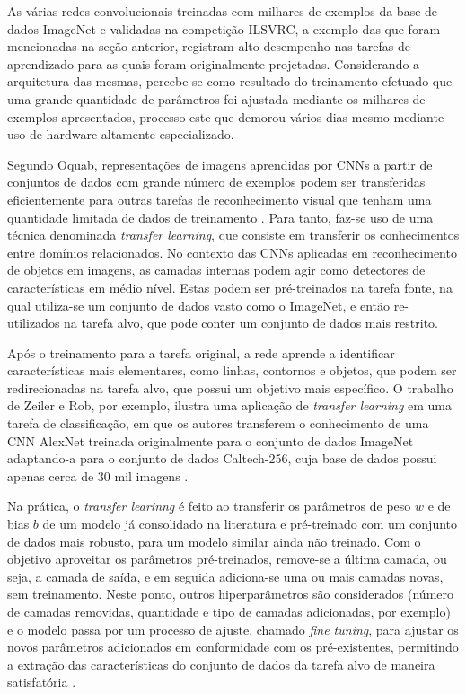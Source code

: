 As várias redes convolucionais treinadas com milhares de exemplos da base de dados ImageNet e validadas na competição ILSVRC, a exemplo das que foram mencionadas na seção anterior, registram alto desempenho nas tarefas de aprendizado para as quais foram originalmente projetadas. Considerando a arquitetura das mesmas, percebe-se como resultado do treinamento efetuado que uma grande quantidade de parâmetros foi ajustada mediante os milhares de exemplos apresentados, processo este que demorou vários dias mesmo mediante uso de hardware altamente especializado.

Segundo Oquab, representações de imagens aprendidas por CNNs a partir de conjuntos de dados com grande número de exemplos podem ser transferidas eficientemente para outras tarefas de reconhecimento visual que tenham uma quantidade limitada de dados de treinamento \cite{oquab2014learning}. Para tanto, faz-se uso de uma técnica denominada \emph{transfer learning}, que consiste em transferir os conhecimentos entre domínios relacionados. No contexto das CNNs aplicadas em reconhecimento de objetos em imagens, as camadas internas podem agir como detectores de características em médio nível. Estas podem ser pré-treinados na tarefa fonte, na qual utiliza-se um conjunto de dados vasto como o ImageNet, e então re-utilizados na tarefa alvo, que pode conter um conjunto de dados mais restrito.

Após o treinamento para a tarefa original, a rede aprende a identificar características mais elementares, como linhas, contornos e objetos, que podem ser redirecionadas na tarefa alvo, que possui um objetivo mais específico. O trabalho de Zeiler e Rob, por exemplo, ilustra uma aplicação de \emph{transfer learning} em uma tarefa de classificação, em que os autores transferem o conhecimento de uma CNN AlexNet treinada originalmente para o conjunto de dados ImageNet adaptando-a para o conjunto de dados Caltech-256, cuja base de dados possui apenas cerca de 30 mil imagens \cite{zeiler2014visualizing}.

Na prática, o \emph{transfer learinng} é feito ao transferir os parâmetros de peso $w$ e de bias $b$ de um modelo já consolidado na literatura e pré-treinado com um conjunto de dados mais robusto, para um modelo similar ainda não treinado. Com o objetivo aproveitar os parâmetros pré-treinados, remove-se a última camada, ou seja, a camada de saída, e em seguida adiciona-se uma ou mais camadas novas, sem treinamento. Neste ponto, outros hiperparâmetros são considerados (número de camadas removidas, quantidade e tipo de camadas adicionadas, por exemplo) e o modelo passa por um processo de ajuste, chamado \emph{fine tuning}, para ajustar os novos parâmetros adicionados em conformidade com os pré-existentes, permitindo a extração das características do conjunto de dados da tarefa alvo de maneira satisfatória \cite{oquab2014learning}.
